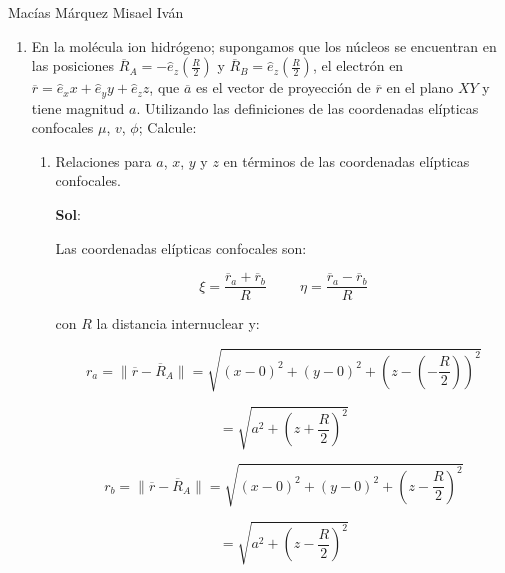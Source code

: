 \documentclass[12pt,a4paper]{article}
\providecommand{\norm}[1]{\lVert#1\rVert}
\begin{document}
Macías Márquez Misael Iván

\begin{enumerate}






\item En la molécula ion hidrógeno; supongamos que los núcleos se encuentran en las posiciones $\overline{R}_A= -\hat{e}_{z}\left(\frac{R}{2}\right)$ y $\overline{R}_B = \hat{e}_{z} \left(\frac{R}{2}\right)$, el electrón en $\overline{r}= \hat{e}_x x+ \hat{e}_y y + \hat{e}_z z$, que $\overline{a}$ es el vector de proyección de $\overline{r}$ en el plano $XY$ y tiene magnitud $a$. Utilizando las definiciones de las coordenadas elípticas confocales $\mu$, $v$, $\phi$; Calcule:

\begin{enumerate}
    \item Relaciones para $a$, $x$, $y$ y $z$ en términos de las coordenadas elípticas confocales.
    
    \textbf{Sol}:
    
    Las coordenadas elípticas confocales son:
    
    \begin{equation*}
        \xi = \frac{\overline{r}_a+\overline{r}_b}{R} \hspace{1cm} \eta = \frac{\overline{r}_a- \overline{r}_b}{R}
    \end{equation*}
    
    con $R$ la distancia internuclear y:
    
    \begin{equation*}
        r_a = \norm{\overline{r}- \overline{R}_A} = \sqrt{(x-0)^2 + (y-0)^2 + (z- (-\frac{R}{2}))^2} 
    \end{equation*}
    
    \begin{equation*}
        = \sqrt{a^2 + (z+\frac{R}{2})^2}
    \end{equation*}
    
    \begin{equation*}
        r_b = \norm{\overline{r}-\overline{R}_A} = \sqrt{(x-0)^2+(y-0)^2+(z-\frac{R}{2})^2}
    \end{equation*}
    
    \begin{equation*}
        = \sqrt{a^2 + (z- \frac{R}{2})^2}
    \end{equation*}
    

\end{enumerate}
\end{enumerate}
\end{document}
